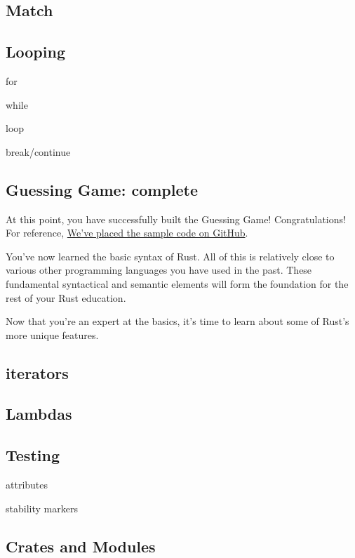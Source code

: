\documentclass[]{article}
\begin{document}
\subsection{Match}\label{match}

\subsection{Looping}\label{looping}

for

while

loop

break/continue

\subsection{Guessing Game: complete}\label{guessing-game-complete}

At this point, you have successfully built the Guessing Game!
Congratulations! For reference,
\href{https://github.com/steveklabnik/guessing_game}{We've placed the
sample code on GitHub}.

You've now learned the basic syntax of Rust. All of this is relatively
close to various other programming languages you have used in the past.
These fundamental syntactical and semantic elements will form the
foundation for the rest of your Rust education.

Now that you're an expert at the basics, it's time to learn about some
of Rust's more unique features.

\subsection{iterators}\label{iterators}

\subsection{Lambdas}\label{lambdas}

\subsection{Testing}\label{testing}

attributes

stability markers

\subsection{Crates and Modules}\label{crates-and-modules}
\end{document}
